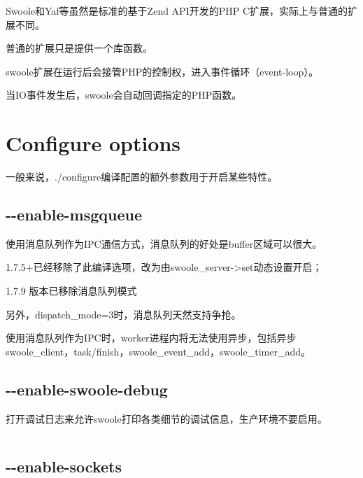 Swoole和Yaf等虽然是标准的基于Zend API开发的PHP C扩展，实际上与普通的扩展不同。

\begin{compactitem}
\item 普通的扩展只是提供一个库函数。
\item swoole扩展在运行后会接管PHP的控制权，进入事件循环（event-loop）。
\end{compactitem}

当IO事件发生后，swoole会自动回调指定的PHP函数。

\section{Configure options}


一般来说，./configure编译配置的额外参数用于开启某些特性。

\subsection{-\/-enable-msgqueue}

使用消息队列作为IPC通信方式，消息队列的好处是buffer区域可以很大。

\begin{compactitem}
\item 1.7.5+已经移除了此编译选项，改为由swoole\_server->set动态设置开启；
\item 1.7.9 版本已移除消息队列模式
\end{compactitem}



另外，dispatch\_mode=3时，消息队列天然支持争抢。


使用消息队列作为IPC时，worker进程内将无法使用异步，包括异步swoole\_client，task/finish，swoole\_event\_add，swoole\_timer\_add。

\subsection{-\/-enable-swoole-debug}

打开调试日志来允许swoole打印各类细节的调试信息，生产环境不要启用。

\begin{lstlisting}[language=bash]

\end{lstlisting}

\subsection{-\/-enable-sockets}


